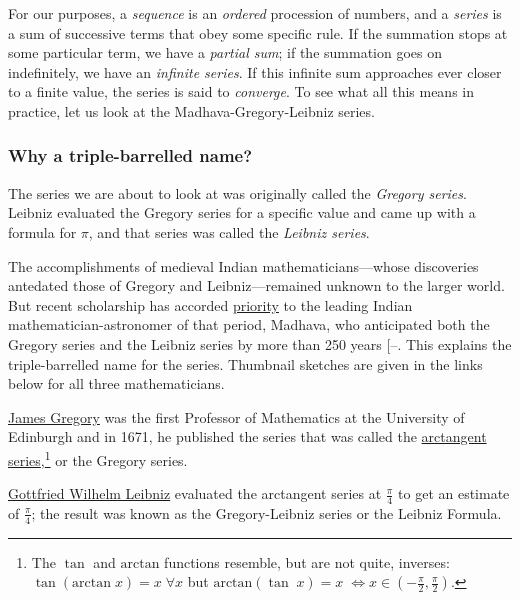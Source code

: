 \documentclass[
  a4paper,
]{article}
\begin{document}
For our purposes, a \emph{sequence} is an \emph{ordered} procession of
numbers, and a \emph{series} is a sum of successive terms that obey some
specific rule. If the summation stops at some particular term, we have a
\emph{partial sum}; if the summation goes on indefinitely, we have an
\emph{infinite series}. If this infinite sum approaches ever closer to a
finite value, the series is said to \emph{converge}. To see what all
this means in practice, let us look at the Madhava-Gregory-Leibniz
series.

\subsubsection{Why a triple-barrelled
name?}\label{why-a-triple-barrelled-name}

The series we are about to look at was originally called the
\emph{Gregory series}. Leibniz evaluated the Gregory series for a
specific value and came up with a formula for \(\pi\), and that series
was called the \emph{Leibniz series}.

The accomplishments of medieval Indian mathematicians---whose
discoveries antedated those of Gregory and Leibniz---remained unknown to
the larger world. But recent scholarship has accorded
\href{https://en.wikipedia.org/wiki/Scientific_priority}{priority} to
the leading Indian mathematician-astronomer of that period, Madhava, who
anticipated both the Gregory series and the Leibniz series by more than
250 years
{[}--\citeproc{ref-madhava-wiki}{21}{]}. This
explains the triple-barrelled name for the series. Thumbnail sketches
are given in the links below for all three mathematicians.

\href{https://en.wikipedia.org/wiki/James_Gregory_(mathematician)}{James
Gregory} was the first Professor of Mathematics at the University of
Edinburgh and in 1671, he published the series that was called the
\href{https://en.wikipedia.org/wiki/Arctangent_series}{arctangent
series},\footnote{The \(\tan\) and \(\mathrm{arctan}\) functions
  resemble, but are not quite, inverses:
  \(\tan(\mathrm{arctan}\;x) = x \;\forall x\) but
  \(\mathrm{arctan}(\tan\;x) = x\; \iff x \in (−\frac{\pi}{2}, \frac{\pi}{2})\).}
or the Gregory series.

\href{https://www.google.com/search?q=Leibniz}{Gottfried Wilhelm
Leibniz} evaluated the arctangent series at \(\frac{\pi}{4}\) to get an
estimate of \(\frac{\pi}{4}\); the result was known as the
Gregory-Leibniz series or the Leibniz Formula.
\end{document}

